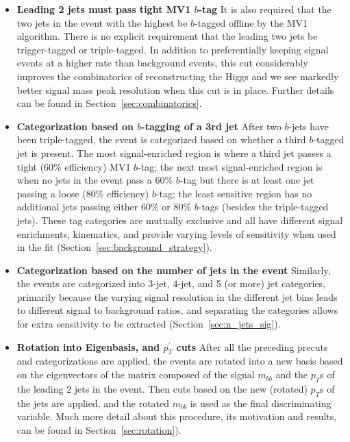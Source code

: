 \begin{itemize}
\item\textbf{Leading 2 jets must pass tight MV1 $b$-tag}
It is also required that the two jets in the event with the highest \pt be $b$-tagged
offline by the MV1 algorithm.  There is no explicit requirement that the leading
two jets be trigger-tagged or triple-tagged.
  In addition to preferentially keeping signal events at a higher rate than
background events, this cut considerably improves the combinatorics of reconstructing
the Higgs and we see markedly better signal mass peak resolution when this cut is in
place.  Further details can be found in Section~\ref{sec:combinatorics}.


\item
\textbf{Categorization based on $b$-tagging of a 3rd jet}
After two
$b$-jets have been triple-tagged, the event is categorized based on whether
a third $b$-tagged jet is present.  The most signal-enriched region is where
a third jet passes a tight (60\% efficiency) MV1 $b$-tag; the next most
signal-enriched region is when no jets in the event pass a 60\% $b$-tag
but there is at least one jet passing a loose (80\% efficiency) $b$-tag;
the least sensitive region has no additional jets passing either 60\% or 
80\% $b$-tags (besides the triple-tagged jets).  These tag categories are
mutually exclusive and all have different signal enrichments, kinematics, 
and provide varying levels of sensitivity when used in the fit (Section~\ref{sec:background_strategy}).

\item
\textbf{Categorization based on the number of jets in the event}
Similarly, the events are categorized into 3-jet, 4-jet, and 5 (or more) jet
categories, primarily because the varying signal resolution in the different
jet bins leads to different signal to background ratios, and separating
the categories allows for extra sensitivity to be extracted (Section~\ref{sec:n_jets_sig}).

\item 
\textbf{Rotation into Eigenbasis, and $p_T^{'}$ cuts}
After all the preceding precuts and categorizations are applied, the events
are rotated into a new basis based on the eigenvectors of the matrix composed of the
signal $m_{bb}$ and the $p_T$s of the leading 2 jets in the event.  Then cuts
based on the new (rotated) $p_T$s of the jets are applied, and the rotated $m_{bb}$
is used as the final discriminating variable.  Much more detail about this procedure,
its motivation and results, can be found in Section~\ref{sec:rotation}).



\end{itemize}



